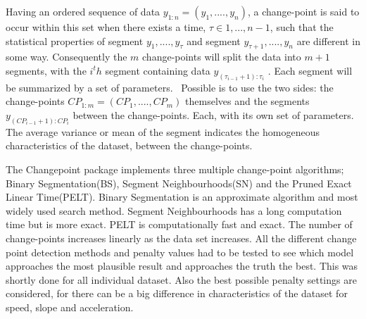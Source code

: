 Having an ordered sequence of data $y_{1:n} = (y_{1}, .... , y_{n})$, a change-point is said to occur within this set when there exists a time, $τ ∈ {1, . . . , n − 1}$, such that the statistical properties of segment ${y_{1}, .... , y_{τ}}$ and segment ${y_{τ+1}, .... , y_{n}}$ are different in some way. Consequently the $m$ change-points will split the data into $m + 1$ segments, with the $i^th$ segment containing data $y_{(τ_{i−1} +1):τ_{i}}$ . Each segment will be summarized by a set of parameters.~\cite{killick2014} Possible is to use the two sides: the change-points $CP_{1:m} = (CP_{1}, .... , CP_{m})$ themselves and the segments $y_{(CP_{i−1} +1):CP_{i}}$ between the change-points. Each, with its own set of parameters. 
The average variance or mean of the segment indicates the homogeneous  characteristics of the dataset, between the change-points. 

The Changepoint package implements three multiple change-point algorithms; Binary Segmentation(BS), Segment Neighbourhoods(SN) and the Pruned Exact Linear Time(PELT). Binary Segmentation is an approximate algorithm and most widely used search method. Segment Neighbourhoods has a long computation time but is more exact. PELT is computationally fast and exact. The number of change-points increases linearly as the data set increases. All the different change point detection methods and penalty values had to be tested to see which model approaches the most plausible result and approaches the truth the best. This was shortly done for all individual dataset. Also the best possible penalty settings are considered, for there can be a big difference in characteristics of the dataset for speed, slope and acceleration. 

